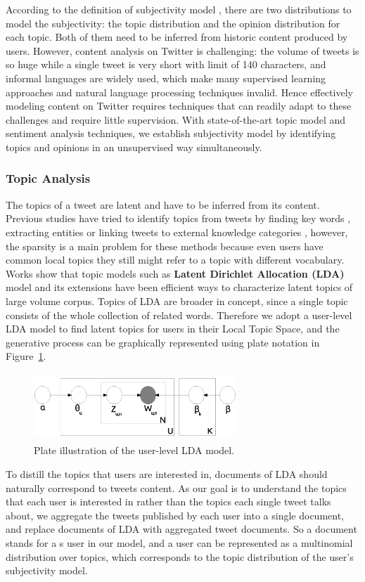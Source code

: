 \documentclass[twocolumn]{svjour3}          %
\begin{document}
According to the definition of subjectivity model , there are two distributions to model the subjectivity: the topic distribution and the opinion distribution for each topic. Both of them need to be inferred from historic content produced by users.
However, content analysis on Twitter is challenging: the volume of tweets is so huge while a single tweet is very short with limit of 140 characters, and informal languages are widely used, which make many supervised learning approaches and natural language processing techniques invalid. 
Hence effectively modeling content on Twitter requires techniques that can readily adapt to these challenges and require little supervision. 
With state-of-the-art topic model and sentiment analysis techniques, we establish subjectivity model by identifying topics and opinions in an unsupervised way simultaneously. 

\subsubsection{Topic Analysis}
\label{topic}

The topics of a tweet are latent and have to be inferred from its content.
Previous studies have tried to identify topics from tweets by finding key words \cite{chen2010short}, extracting  entities \cite{Abel:2011AUM} or linking tweets to external knowledge categories \cite{conf/icwsm/MacskassyM11}, however, the sparsity is a main problem for these methods because even users have common local topics they still might refer to a topic with different vocabulary.
Works show that topic models such as \textbf{Latent Dirichlet Allocation (LDA)} model and its extensions\cite{blei2003latent,conf/wsdm/WengLJH10} have been efficient ways to characterize latent topics of large volume corpus.  
Topics of LDA are broader in concept, since a single topic consists of the whole collection of related words. 
Therefore we adopt a user-level LDA model to find latent topics for users in their Local Topic Space, and the generative process can be graphically represented using plate notation in Figure~\ref{fig1}.
\begin{figure}[htb]
\centering
\includegraphics[width=3.0in,height=1.0in]{fig1.eps}
\caption{Plate illustration of the user-level LDA model.}
\label{fig1}
\end{figure}
To distill the topics that users are interested in, documents of LDA should naturally correspond to tweets content. 
As our goal is to understand the topics that each user is interested in rather than the topics each single tweet talks about, we aggregate the tweets published by each user into a single document, and replace documents of LDA with aggregated tweet documents. 
So a document stands for a s user in our model, and a user can be represented as a multinomial distribution over topics, which corresponds to the topic distribution of the user's subjectivity model.
\end{document}

